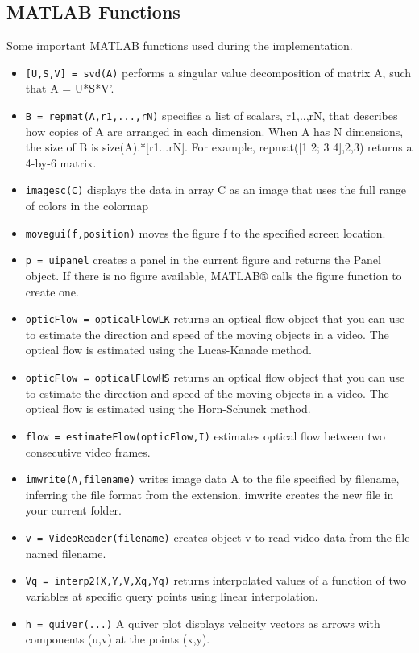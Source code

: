 \documentclass{article}
\begin{document}
\pagebreak
\begin{appendices}

\section{MATLAB Functions}
Some important MATLAB functions used during the implementation.
\begin{itemize}
\item \texttt{[U,S,V] = svd(A)} performs a singular value decomposition of matrix A, such that A = U*S*V'.
\item \texttt{B = repmat(A,r1,...,rN)} specifies a list of scalars, r1,..,rN, that describes how copies of A are arranged in each dimension. When A has N dimensions, the size of B is size(A).*[r1...rN]. For example, repmat([1 2; 3 4],2,3) returns a 4-by-6 matrix.
\item \texttt{imagesc(C)} displays the data in array C as an image that uses the full range of colors in the colormap
\item \texttt{movegui(f,position)} moves the figure f to the specified screen location.
\item \texttt{p = uipanel} creates a panel in the current figure and returns the Panel object. If there is no figure available, MATLAB® calls the figure function to create one.
\item \texttt{opticFlow = opticalFlowLK} returns an optical flow object that you can use to estimate the direction and speed of the moving objects in a video. The optical flow is estimated using the Lucas-Kanade method.
\item \texttt{opticFlow = opticalFlowHS} returns an optical flow object that you can use to estimate the direction and speed of the moving objects in a video. The optical flow is estimated using the Horn-Schunck method.
\item \texttt{flow = estimateFlow(opticFlow,I)} estimates optical flow between two consecutive video frames.
\item \texttt{imwrite(A,filename)} writes image data A to the file specified by filename, inferring the file format from the extension. imwrite creates the new file in your current folder.
\item \texttt{v = VideoReader(filename)} creates object v to read video data from the file named filename.
\item \texttt{Vq = interp2(X,Y,V,Xq,Yq)} returns interpolated values of a function of two variables at specific query points using linear interpolation.
\item \texttt{h = quiver(...)} A quiver plot displays velocity vectors as arrows with components (u,v) at the points (x,y).
\end{itemize}


\end{appendices}
\end{document}
